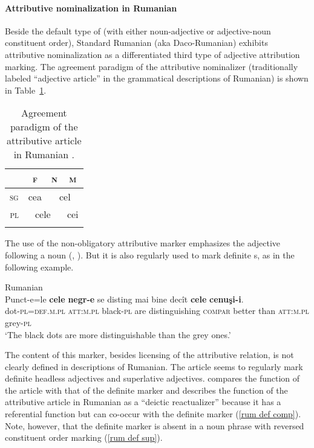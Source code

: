 \paragraph*{Attributive nominalization in Rumanian}
\label{rumanian synchr}
Beside the default type of  (with either noun-adjective or adjective-noun constituent order), Standard Rumanian (aka Daco-Rumanian) exhibits attributive nominalization as a differentiated third type of adjective attribution marking. The agreement paradigm of the attributive nominalizer (traditionally labeled “adjective article” in the grammatical descriptions of Rumanian) is shown in Table~\ref{rumanian art}.
\begin{table}
\begin{tabular}{r c c c}
\lsptoprule		
			&\textsc{f}				&\textsc{n}		&\textsc{m}\\
\midrule
\textsc{sg}		&cea					&\multicolumn{2}{|c}{cel}\\
\midrule
\textsc{pl}		&\multicolumn{2}{c|}{cele}					&cei\\
\lspbottomrule
\end{tabular}
\caption[Article paradigm for Rumanian]{Agreement paradigm of the attributive article in Rumanian \citep[94]{beyer-etal1987}.
}
\label{rumanian art}
\end{table}
The use of the non-obligatory attributive marker emphasizes the adjective following a noun (\citealt[94]{beyer-etal1987}, \citealt[148]{posner1996}). But it is also regularly used to mark definite s, as in the following example.
\begin{exe}
\ex \rm{Rumanian \citep[94]{beyer-etal1987}}\\ %
\gll Punct-e=le \textbf{cele} \textbf{negr-e} se disting mai bine decît \textbf{cele} \textbf{cenuşi-i}.\\
dot-\textsc{pl}=\textsc{def.m.pl} \textsc{att:m.pl} black-\textsc{pl} are distinguishing \textsc{compar} better than \textsc{att:m.pl} grey-\textsc{pl}\\
\glt ‘The black dots are more distinguishable than the grey ones.’
\end{exe}
The content of this marker, besides licensing of the attributive relation, is not clearly defined in descriptions of Rumanian. The article seems to regularly mark definite headless adjectives and superlative adjectives. \citet[141]{kramsky1972} compares the function of the article with that of the definite marker and describes the function of the attributive article in Rumanian as a “deictic reactualizer” because it has a referential function but can co-occur with the definite marker (\ref{rum def comp}). Note, however, that the definite marker is absent in a noun phrase with reversed constituent order marking  (\ref{rum def sup}).
